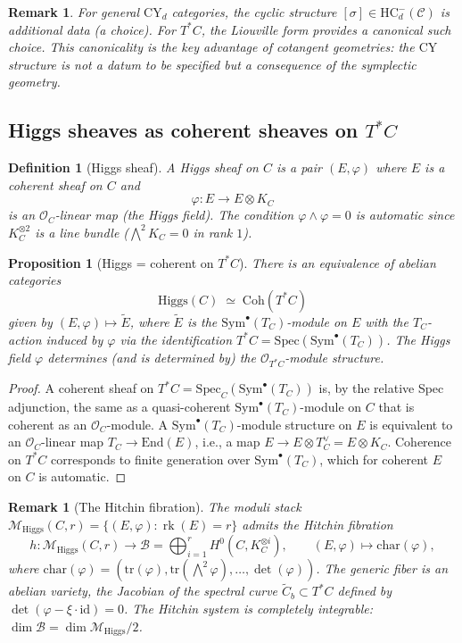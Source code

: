 \documentclass[11pt]{article}
\theoremstyle{garamondthm}
\newtheorem{proposition}[theorem]{Proposition}
\theoremstyle{garamonddef}
\newtheorem{definition}[theorem]{Definition}
\theoremstyle{garamondrem}
\newtheorem{remark}[theorem]{Remark}
\newcommand{\Coh}{\mathrm{Coh}}
\newcommand{\CY}{\mathrm{CY}}
\newcommand{\HC}{\mathrm{HC}}
\newcommand{\Sym}{\mathrm{Sym}}
\newcommand{\End}{\mathrm{End}}
\newcommand{\id}{\mathrm{id}}
\newcommand{\cB}{\mathcal{B}}
\newcommand{\cC}{\mathcal{C}}
\newcommand{\cM}{\mathcal{M}}
\newcommand{\cO}{\mathcal{O}}
\newcommand{\Higgs}{\mathrm{Higgs}}
\newcommand{\Spec}{\mathrm{Spec}}
\DeclareMathOperator{\rk}{rk}
\begin{document}
\begin{remark}
\label{rem:cy2-trace-canonical}
For general $\CY_d$ categories, the cyclic structure $[\sigma] \in \HC^-_d(\cC)$ is additional data (a choice). For $T^*C$, the Liouville form provides a \emph{canonical} such choice. This canonicality is the key advantage of cotangent geometries: the $\CY$ structure is not a datum to be specified but a consequence of the symplectic geometry.
\end{remark}

\subsection{Higgs sheaves as coherent sheaves on $T^*C$}
\label{ssec:higgs-coh}

\begin{definition}[Higgs sheaf]
\label{def:higgs-sheaf}
A \emph{Higgs sheaf} on $C$ is a pair $(E, \varphi)$ where $E$ is a coherent sheaf on $C$ and
\[
 \varphi \colon E \longrightarrow E \otimes K_C
\]
is an $\cO_C$-linear map (the \emph{Higgs field}). The condition $\varphi \wedge \varphi = 0$ is automatic since $K_C^{\otimes 2}$ is a line bundle ($\bigwedge^2 K_C = 0$ in rank $1$).
\end{definition}

\begin{proposition}[Higgs = coherent on $T^*C$]
\label{prop:higgs-coh-equiv}
There is an equivalence of abelian categories
\[
 \Higgs(C) \;\simeq\; \Coh(T^*C)
\]
given by $(E, \varphi) \mapsto \widetilde{E}$, where $\widetilde{E}$ is the $\Sym^\bullet(T_C)$-module on $E$ with the $T_C$-action induced by $\varphi$ via the identification $T^*C = \Spec(\Sym^\bullet(T_C))$. The Higgs field $\varphi$ determines (and is determined by) the $\cO_{T^*C}$-module structure.
\end{proposition}

\begin{proof}
A coherent sheaf on $T^*C = \Spec_C(\Sym^\bullet(T_C))$ is, by the relative Spec adjunction, the same as a quasi-coherent $\Sym^\bullet(T_C)$-module on $C$ that is coherent as an $\cO_C$-module. A $\Sym^\bullet(T_C)$-module structure on $E$ is equivalent to an $\cO_C$-linear map $T_C \to \End(E)$, i.e., a map $E \to E \otimes T_C^\vee = E \otimes K_C$. Coherence on $T^*C$ corresponds to finite generation over $\Sym^\bullet(T_C)$, which for coherent $E$ on $C$ is automatic.
\end{proof}

\begin{remark}[The Hitchin fibration]
\label{rem:hitchin-fibration}
The moduli stack $\cM_{\Higgs}(C, r) = \{(E, \varphi) : \rk(E) = r\}$ admits the Hitchin fibration
\[
 h \colon \cM_{\Higgs}(C, r) \longrightarrow \cB = \bigoplus_{i=1}^r H^0(C, K_C^{\otimes i}), \qquad (E, \varphi) \longmapsto \mathrm{char}(\varphi),
\]
where $\mathrm{char}(\varphi) = (\mathrm{tr}(\varphi), \mathrm{tr}(\bigwedge^2 \varphi), \ldots, \det(\varphi))$. The generic fiber is an abelian variety, the Jacobian of the spectral curve $\widetilde{C}_b \subset T^*C$ defined by $\det(\varphi - \xi \cdot \id) = 0$. The Hitchin system is completely integrable: $\dim \cB = \dim \cM_{\Higgs}/2$.
\end{remark}
\end{document}

